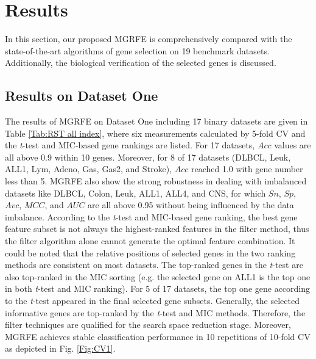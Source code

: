 \documentclass[10pt,journal,compsoc]{IEEEtran}
\begin{document}
	\section{Results}
	
	In this section, our proposed MGRFE is comprehensively compared with the state-of-the-art algorithms of gene selection on 19 benchmark datasets.
	Additionally, the biological verification of the selected genes is discussed.
	
	\subsection{Results on Dataset One}
	 
	The results of MGRFE on Dataset One including 17 binary datasets are given in Table \ref{Tab:RST all index}, where six measurements calculated by 5-fold CV and the \textit{t}-test and MIC-based gene rankings are listed. For 17 datasets, \(Acc\) values are all above 0.9 within 10 genes. Moreover, for 8 of 17 datasets (DLBCL, Leuk, ALL1, Lym, Adeno, Gas, Gas2, and Stroke), \(Acc\) reached 1.0 with gene number less than 5. MGRFE also show the strong robustness in dealing with imbalanced datasets like DLBCL, Colon, Leuk, ALL1, ALL4, and CNS, for which \(Sn\), \(Sp\), \(Avc\), \(MCC\), and \(AUC\) are all above 0.95 without being influenced by the data imbalance. 
	According to the \textit{t}-test and MIC-based gene ranking, the best gene feature subset is not always the highest-ranked features in the filter method, thus the filter algorithm alone cannot generate the optimal feature combination.
	It could be noted that the relative positions of selected genes in the two ranking methods are consistent on most datasets. The top-ranked genes in the \textit{t}-test are also top-ranked in the MIC sorting (e.g. the selected gene on ALL1 is the top one in both \textit{t}-test and MIC ranking). For 5 of 17 datasets, the top one gene  according to the \textit{t}-test appeared in the final selected gene subsets. Generally, the selected informative genes are top-ranked by the \textit{t}-test and MIC methods. Therefore, the filter techniques are qualified for the search space reduction stage. Moreover, MGRFE achieves stable classification performance in 10 repetitions of 10-fold CV as depicted in Fig. \ref{Fig:CV1}.
	
\end{document}
